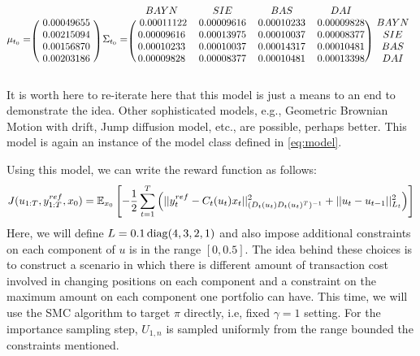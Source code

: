 \begin{equation}
\mu_{t_0} =
\begin{blockarray}{c}
\\
\begin{block}{(c)}
~ 0.00049655 ~ \\
0.00215094 \\
0.00156870 \\
0.00203186 \\
\end{block}
\end{blockarray}
~\Sigma_{t_0} =
\begin{blockarray}{ccccc}
  BAYN & SIE & BAS & DAI & \\
\begin{block}{(cccc)c}
 ~ 0.00011122 & 0.00009616 & 0.00010233 & 0.00009828 ~ & BAYN \\
0.00009616 & 0.00013975 & 0.00010037 & 0.00008377 ~ & SIE \\
0.00010233 & 0.00010037 & 0.00014317 & 0.00010481 & BAS \\
0.00009828 & 0.00008377 & 0.00010481 & 0.00013398 & DAI \\
\end{block}
\end{blockarray}
\end{equation}
 
It is worth here to re-iterate here that this model is just a means to an end to demonstrate the idea. Other sophisticated models, e.g., Geometric Brownian Motion with drift, Jump diffusion model, etc., are possible, perhaps better. This model is again an instance of the model class defined in \eqref{eq:model}.

Using this model, we can write the reward function as follows:
\begin{equation}
  J(u_{1:T},y^{ref}_{1:T}, x_0) = \operatorname{\mathbb{E}}_{x_0}\left[ -\dfrac{1}{2}\displaystyle\sum^T_{t=1}\left(\vert\vert y^{ref}_t - C_t(u_t)x_t \vert\vert^2_{(D_t(u_t)D_t(u_t)^T)^{-1}}  + \vert\vert u_t - u_{t-1} \vert\vert^2_{L_t}\right) \right]
\end{equation}
Here, we will define $L = 0.1\operatorname{diag}(4,3,2,1)$ and also impose additional constraints on each component of $u$ is in the range $[0,0.5]$. The idea behind these choices is to construct a scenario in which there is different amount of transaction cost involved in changing positions on each component and a constraint on the maximum amount on each component one portfolio can have. This time, we will use the SMC algorithm to target $\pi$ directly, i.e, fixed $\gamma=1$ setting. For the importance sampling step, $U_{1,n}$ is sampled uniformly from the range bounded the constraints mentioned. 

